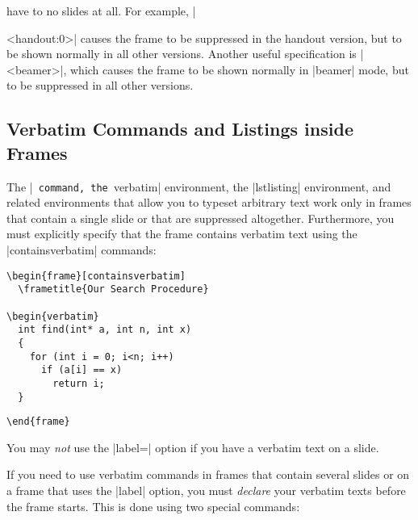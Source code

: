 have to no slides at all. For example, |\begin{frame}<handout:0>| causes
the frame to be suppressed in the handout version, but to be shown
normally in all other versions. Another useful specification is
|<beamer>|, which causes the frame to be shown normally in |beamer|
mode, but to be suppressed in all other versions.


\subsection{Verbatim Commands and Listings inside Frames}
\label{section-verbatim}

The |\verb| command, the |verbatim| environment, the
|lstlisting| environment, and related environments that allow
you to typeset arbitrary text work only in
frames that contain a single slide or that are suppressed
altogether. Furthermore, you must explicitly specify that the frame
contains verbatim text using the |containsverbatim| commands:
\begin{verbatim}
\begin{frame}[containsverbatim]
  \frametitle{Our Search Procedure}

\begin{verbatim}
  int find(int* a, int n, int x)
  {
    for (int i = 0; i<n; i++)
      if (a[i] == x)
        return i;
  }
\end{verbatim}
\unskip{\MacroFont|\end{verbatim}|}
\begin{verbatim}
\end{frame}
\end{verbatim}

You may \emph{not} use the |label=| option if you
have a verbatim text on a slide.

If you need to use verbatim commands in frames that contain several
slides or on a frame that uses the |label| option, you must
\emph{declare} your verbatim texts before the frame starts. This is
done using two special commands:


\end{frame}
